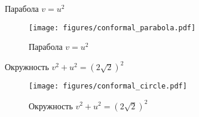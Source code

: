 \begin{frame}{Парабола \(v = u^2\)}
	\begin{figure}
		\centering
		\texttt{[image: figures/conformal\_parabola.pdf]}
		\caption{Парабола \(v=u^2\)}\label{fig:conformal_parabola}
	\end{figure}
\end{frame}

\begin{frame}{Окружность \(v^2 + u^2 = (2 \sqrt 2)^2\)}
	\begin{figure}
		\centering
		\texttt{[image: figures/conformal\_circle.pdf]}
    \caption{Окружность \(v^2 + u^2 = (2 \sqrt 2)^2\)}\label{fig:conformal_circle}
	\end{figure}
\end{frame}
